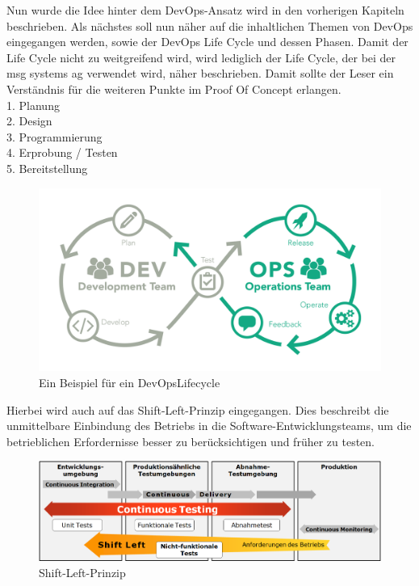 Nun wurde die Idee hinter dem DevOps-Ansatz wird in den vorherigen Kapiteln beschrieben. Als nächstes soll nun näher auf die inhaltlichen Themen von DevOps eingegangen werden, sowie der DevOps Life Cycle und dessen Phasen. Damit der Life Cycle nicht zu weitgreifend wird, wird lediglich der Life Cycle, der bei der msg systems ag verwendet wird, näher beschrieben. Damit sollte der Leser ein Verständnis für die weiteren Punkte im Proof Of Concept erlangen.\\


1. Planung\\

2. Design\\

3. Programmierung\\

4. Erprobung / Testen\\

5. Bereitstellung\\

\begin{figure}[h]
    \centering
    \includegraphics[scale=0.15]{Bilder/slider-realtech-devops-for-sap-acht}
    \caption{Ein Beispiel für ein DevOpsLifecycle}
\end{figure}

Hierbei wird auch auf das Shift-Left-Prinzip eingegangen. Dies beschreibt die unmittelbare Einbindung des Betriebs in die Software-Entwicklungsteams, um die betrieblichen Erfordernisse besser zu berücksichtigen und früher zu testen.

\begin{figure}[h]
    \centering
    \includegraphics[scale=0.3]{Bilder/shift-left}
    \caption{Shift-Left-Prinzip}
\end{figure}

